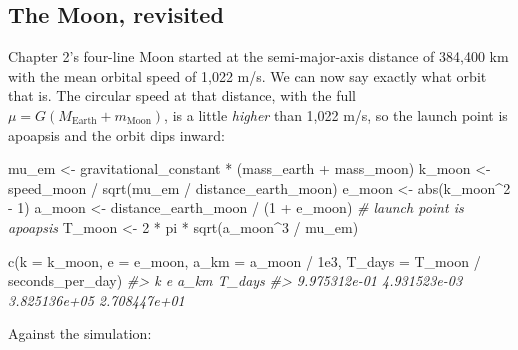 \documentclass[
  10.5pt,
  letterpaper,
]{scrbook}
\newenvironment{Shaded}{\begin{snugshade}}{\end{snugshade}}
\newcommand{\AttributeTok}[1]{\textcolor[rgb]{0.00,0.00,0.00}{#1}}
\newcommand{\CommentTok}[1]{\textcolor[rgb]{0.00,0.00,0.00}{\textit{#1}}}
\newcommand{\DecValTok}[1]{\textcolor[rgb]{0.00,0.00,0.00}{#1}}
\newcommand{\FloatTok}[1]{\textcolor[rgb]{0.00,0.00,0.00}{#1}}
\newcommand{\FunctionTok}[1]{\textcolor[rgb]{0.00,0.00,0.00}{#1}}
\newcommand{\NormalTok}[1]{\textcolor[rgb]{0.00,0.00,0.00}{#1}}
\newcommand{\OtherTok}[1]{\textcolor[rgb]{0.00,0.00,0.00}{#1}}
\newcommand{\SpecialCharTok}[1]{\textcolor[rgb]{0.00,0.00,0.00}{#1}}
\theoremstyle{plain}
\theoremstyle{remark}
\begin{document}
\subsection{The Moon, revisited}\label{the-moon-revisited}

Chapter 2's four-line Moon started at the semi-major-axis distance of
384,400 km with the mean orbital speed of 1,022 m/s. We can now say
exactly what orbit that is. The circular speed at that distance, with
the full \(\mu = G(M_{\mathrm{Earth}} + m_{\mathrm{Moon}})\), is a
little \emph{higher} than 1,022 m/s, so the launch point is apoapsis and
the orbit dips inward:

\begin{Shaded}
\begin{Highlighting}[]
\NormalTok{mu\_em  }\OtherTok{\textless{}{-}}\NormalTok{ gravitational\_constant }\SpecialCharTok{*}\NormalTok{ (mass\_earth }\SpecialCharTok{+}\NormalTok{ mass\_moon)}
\NormalTok{k\_moon }\OtherTok{\textless{}{-}}\NormalTok{ speed\_moon }\SpecialCharTok{/} \FunctionTok{sqrt}\NormalTok{(mu\_em }\SpecialCharTok{/}\NormalTok{ distance\_earth\_moon)}
\NormalTok{e\_moon }\OtherTok{\textless{}{-}} \FunctionTok{abs}\NormalTok{(k\_moon}\SpecialCharTok{\^{}}\DecValTok{2} \SpecialCharTok{{-}} \DecValTok{1}\NormalTok{)}
\NormalTok{a\_moon }\OtherTok{\textless{}{-}}\NormalTok{ distance\_earth\_moon }\SpecialCharTok{/}\NormalTok{ (}\DecValTok{1} \SpecialCharTok{+}\NormalTok{ e\_moon)      }\CommentTok{\# launch point is apoapsis}
\NormalTok{T\_moon }\OtherTok{\textless{}{-}} \DecValTok{2} \SpecialCharTok{*}\NormalTok{ pi }\SpecialCharTok{*} \FunctionTok{sqrt}\NormalTok{(a\_moon}\SpecialCharTok{\^{}}\DecValTok{3} \SpecialCharTok{/}\NormalTok{ mu\_em)}

\FunctionTok{c}\NormalTok{(}\AttributeTok{k =}\NormalTok{ k\_moon, }\AttributeTok{e =}\NormalTok{ e\_moon, }\AttributeTok{a\_km =}\NormalTok{ a\_moon }\SpecialCharTok{/} \FloatTok{1e3}\NormalTok{, }\AttributeTok{T\_days =}\NormalTok{ T\_moon }\SpecialCharTok{/}\NormalTok{ seconds\_per\_day)}
\CommentTok{\#\textgreater{}            k            e         a\_km       T\_days }
\CommentTok{\#\textgreater{} 9.975312e{-}01 4.931523e{-}03 3.825136e+05 2.708447e+01}
\end{Highlighting}
\end{Shaded}

Against the simulation:
\end{document}

